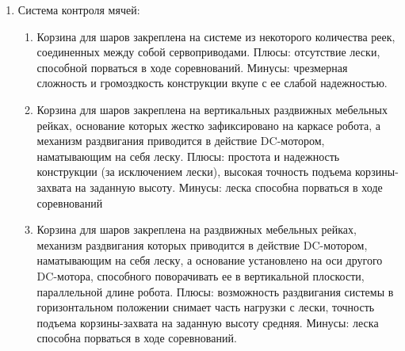 \begin{enumerate}
\begin{enumerate}
\begin{enumerate}
\begin{enumerate}
	    \end{enumerate}
	    
	    \item Система контроля мячей:
	    \begin{enumerate}
	      \item Корзина для шаров закреплена на системе из некоторого количества реек, соединенных между собой сервоприводами. Плюсы: отсутствие лески, способной порваться в ходе соревнований. Минусы: чрезмерная сложность и громоздкость конструкции вкупе с ее слабой надежностью.	
	      
	      \item Корзина для шаров закреплена на вертикальных раздвижных мебельных рейках, основание которых жестко зафиксировано на каркасе робота, а механизм раздвигания приводится в действие DC-мотором, наматывающим на себя леску. Плюсы: простота и надежность конструкции (за исключением лески), высокая точность подъема корзины-захвата на заданную высоту. Минусы: леска способна порваться в ходе соревнований
	      
	      \item Корзина для шаров закреплена на раздвижных мебельных рейках, механизм раздвигания которых приводится в действие DC-мотором, наматывающим на себя леску, а основание установлено на оси другого DC-мотора, способного поворачивать ее в вертикальной плоскости, параллельной длине робота. Плюсы: возможность раздвигания системы в горизонтальном положении снимает часть нагрузки с лески, точность подъема корзины-захвата на заданную высоту средняя. Минусы: леска способна порваться в ходе соревнований.
	      

\end{enumerate}
\end{enumerate}
\end{enumerate}
\end{enumerate}
